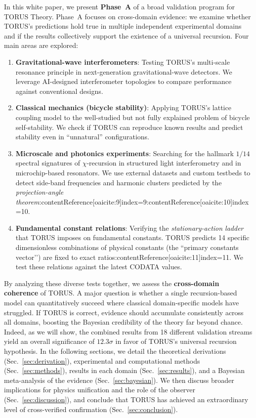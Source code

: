 \documentclass[12pt]{article}
\begin{document}
In this white paper, we present \textbf{Phase~A} of a broad validation program for TORUS Theory. Phase~A focuses on cross-domain evidence: we examine whether TORUS’s predictions hold true in multiple independent experimental domains and if the results collectively support the existence of a universal recursion. Four main areas are explored:
\begin{enumerate}\itemsep 0pt
    \item \textbf{Gravitational-wave interferometers}: Testing TORUS’s multi-scale resonance principle in next-generation gravitational-wave detectors. We leverage AI-designed interferometer topologies to compare performance against conventional designs.
    \item \textbf{Classical mechanics (bicycle stability)}: Applying TORUS’s lattice coupling model to the well-studied but not fully explained problem of bicycle self-stability. We check if TORUS can reproduce known results and predict stability even in “unnatural” configurations.
    \item \textbf{Microscale and photonics experiments}: Searching for the hallmark $1/14$ spectral signatures of $\chi$-recursion in structured light interferometry and in microchip-based resonators. We use external datasets and custom testbeds to detect side-band frequencies and harmonic clusters predicted by the \emph{projection-angle theorem}:contentReference[oaicite:9]{index=9}:contentReference[oaicite:10]{index=10}.
    \item \textbf{Fundamental constant relations}: Verifying the \emph{stationary-action ladder} that TORUS imposes on fundamental constants. TORUS predicts 14 specific dimensionless combinations of physical constants (the ``primary constants vector’’) are fixed to exact ratios:contentReference[oaicite:11]{index=11}. We test these relations against the latest CODATA values.
\end{enumerate}

By analyzing these diverse tests together, we assess the \textbf{cross-domain coherence} of TORUS. A major question is whether a single recursion-based model can quantitatively succeed where classical domain-specific models have struggled. If TORUS is correct, evidence should accumulate consistently across all domains, boosting the Bayesian credibility of the theory far beyond chance. Indeed, as we will show, the combined results from 18 different validation streams yield an overall significance of $12.3\sigma$ in favor of TORUS’s universal recursion hypothesis. In the following sections, we detail the theoretical derivations (Sec.~\ref{sec:derivation}), experimental and computational methods (Sec.~\ref{sec:methods}), results in each domain (Sec.~\ref{sec:results}), and a Bayesian meta-analysis of the evidence (Sec.~\ref{sec:bayesian}). We then discuss broader implications for physics unification and the role of the observer (Sec.~\ref{sec:discussion}), and conclude that TORUS has achieved an extraordinary level of cross-verified confirmation (Sec.~\ref{sec:conclusion}). 
\end{document}
